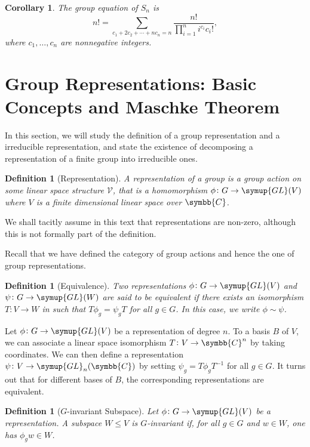 \documentclass{assignment}[2019/10/15]
\theoremstyle{plain}
\newtheorem{definition}[theorem]{Definition}
\newtheorem{corollary}[theorem]{Corollary}
\newcommand{\BC}{\symbb{C}}
\newcommand{\GL}{\mathop{}\!\symup{GL}}
\numberwithin{equation}{section}
\begin{document}
    \begin{corollary}
        The group equation of $S_n$ is
        \begin{equation}
            n! = \sum_{c_1+2c_2+\dotsb+nc_n=n}\frac{n!}{\prod_{i=1}^ni^{c_i}c_i!},
        \end{equation}
        where $c_1, \dotsc, c_n$ are nonnegative integers.
    \end{corollary}

    \section{Group Representations: Basic Concepts and Maschke Theorem}

    In this section, we will study the definition of a group representation and a irreducible representation, and state the existence of decomposing a representation of a finite group into irreducible ones.

    \begin{definition}[Representation]
        A \emph{representation} of a group is a group action on some linear space structure $\mathcal{V}$, that is a homomorphism $\phi\colon G\to\GL(V)$ where $V$ is a finite dimensional linear space over $\BC$.
    \end{definition}

    We shall tacitly assume in this text that representations are non-zero, although this is not formally part of the definition.

    Recall that we have defined the category of group actions and hence the one of group representations.

    \begin{definition}[Equivalence]
        Two representations $\phi\colon G\to \GL(V)$ and $\psi\colon G\to\GL(W)$ are said to be equivalent if there exists an isomorphism $T\colon V\to W$ in such that $T\phi_g = \psi_gT$ for all $g\in G$. In this case, we write $\phi\sim\psi$.
    \end{definition}

    Let $\phi\colon G\to\GL(V)$ be a representation of degree $n$. To a basis $B$ of $V$, we can associate a linear space isomorphism $T\colon V\to \BC^n$ by taking coordinates. We can then define a representation $\psi\colon V\to\GL_n(\BC)$ by setting $\psi_g = T\phi_gT^{-1}$ for all $g\in G$. It turns out that for different bases of $B$, the corresponding representations are equivalent.

    \begin{definition}[$G$-invariant Subspace]
        Let $\phi\colon G\to \GL(V)$ be a representation. A subspace $W\leq V$ is $G$-\emph{invariant} if, for all $g\in G$ and $w\in W$, one has $\phi_gw\in W$.
    \end{definition}
\end{document}
